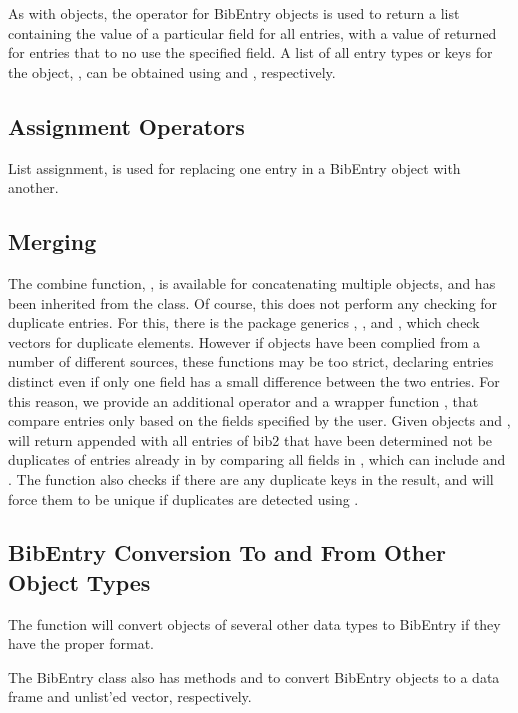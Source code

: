 \documentclass[article]{jss}\usepackage[]{graphicx}\usepackage[]{color}
\begin{document}
As with  objects, the  operator for BibEntry objects is used to return a list containing the value of a particular field for all entries, with a value of  returned for entries that to no use the specified field.  A list of all entry types or keys for the  object, , can be obtained using  and , respectively.
\subsection{Assignment Operators} 
List assignment, \code{'[[<-'} is used for replacing one entry in a BibEntry object with another.
\subsection{Merging}
The combine function, , is available for concatenating multiple  objects, and has been inherited from the  class.  Of course, this does not perform any checking for duplicate entries.  For this, there is the  package generics , , and , which check vectors for duplicate elements.  However if  objects have been complied from a number of different sources, these functions may be too strict, declaring entries distinct even if only one field has a small difference between the two entries.  For this reason, we provide an additional operator  and a wrapper function , that compare entries only based on the fields specified by the user.  Given  objects  and ,  will return  appended with all entries of bib2 that have been determined not be duplicates of entries already in  by comparing all fields in , which can include  and .  The function also checks if there are any duplicate keys in the result, and will force them to be unique if duplicates are detected using . 
\subsection{BibEntry Conversion To and From Other Object Types}
The  function will convert objects of several other data types to BibEntry if they have the proper format.

The BibEntry class also has methods  and  to convert BibEntry objects to a data frame and unlist'ed vector, respectively.

\end{document}
